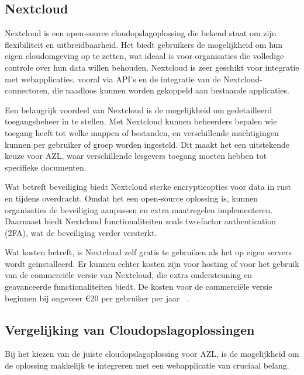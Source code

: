 \subsection{Nextcloud}
Nextcloud is een open-source cloudopslagoplossing die bekend staat om zijn flexibiliteit en uitbreidbaarheid. Het biedt gebruikers de mogelijkheid om hun eigen cloudomgeving op te zetten, wat ideaal is voor organisaties die volledige controle over hun data willen behouden. Nextcloud is zeer geschikt voor integratie met webapplicaties, vooral via API's en de integratie van de Nextcloud-connectoren, die naadloos kunnen worden gekoppeld aan bestaande applicaties.

Een belangrijk voordeel van Nextcloud is de mogelijkheid om gedetailleerd toegangsbeheer in te stellen. Met Nextcloud kunnen beheerders bepalen wie toegang heeft tot welke mappen of bestanden, en verschillende machtigingen kunnen per gebruiker of groep worden ingesteld. Dit maakt het een uitstekende keuze voor AZL, waar verschillende lesgevers toegang moeten hebben tot specifieke documenten.

Wat betreft beveiliging biedt Nextcloud sterke encryptieopties voor data in rust en tijdens overdracht. Omdat het een open-source oplossing is, kunnen organisaties de beveiliging aanpassen en extra maatregelen implementeren. Daarnaast biedt Nextcloud functionaliteiten zoals two-factor authentication (2FA), wat de beveiliging verder versterkt.

Wat kosten betreft, is Nextcloud zelf gratis te gebruiken als het op eigen servers wordt geïnstalleerd. Er kunnen echter kosten zijn voor hosting of voor het gebruik van de commerciële versie van Nextcloud, die extra ondersteuning en geavanceerde functionaliteiten biedt. De kosten voor de commerciële versie beginnen bij ongeveer €20 per gebruiker per jaar ~\autocite{Nextcloud2024}.

\subsection{Vergelijking van Cloudopslagoplossingen}
Bij het kiezen van de juiste cloudopslagoplossing voor AZL, is de mogelijkheid om de oplossing makkelijk te integreren met een webapplicatie van cruciaal belang.

